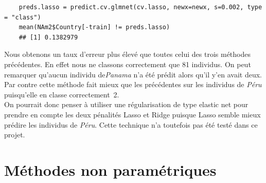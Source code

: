 \documentclass[12pt,a4paper]{article}
\begin{document}
\begin{lstlisting}
	preds.lasso = predict.cv.glmnet(cv.lasso, newx=newx, s=0.002, type = "class")
	mean(NAm2$Country[-train] != preds.lasso)
	## [1] 0.1382979
\end{lstlisting}
Nous obtenons un taux d'erreur plus élevé que toutes celui des trois méthodes
précédentes. En effet nous ne classons correctement que 81 individus. On peut
remarquer qu'aucun individu de\textit{Panama} n'a été prédit alors qu'il y'en avait deux. Par contre cette
méthode fait mieux que les précédentes sur les individus de \textit{Péru}
puisqu'elle en classe correctement~2.\vspace{3mm}\\
On pourrait donc penser à utiliser une régularisation de type \og elastic net \fg pour prendre en compte les deux pénalités Lasso et Ridge puisque Lasso semble mieux prédire les individus de \textit{Péru}. Cette technique n'a toutefois pas été testé dans ce projet.
\section{Méthodes non paramétriques}
\end{document}
